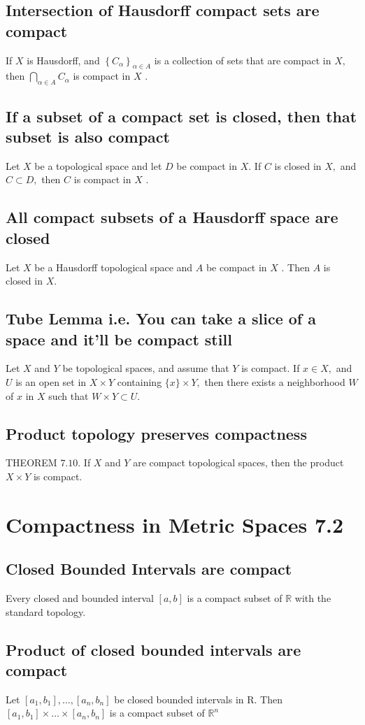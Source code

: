 \documentclass[12pt]{article}
\begin{document}
	\subsection{Intersection of Hausdorff compact sets are compact}
	If $X$ is Hausdorff, and $\left\{ C _ { \alpha } \right\} _ { \alpha \in A }$ is a collection of sets that are	compact in $X ,$ then $\bigcap _ { \alpha \in A } C _ { \alpha }$ is compact in $X$ .
	\subsection{If a subset of a compact set is closed, then that subset is also compact}
	Let $X$ be a topological space and let $D$ be compact in $X $. If $C$ is closed in $X ,$ and $C \subset D ,$ then $C$ is compact in $X$ .
	\subsection{All compact subsets of a Hausdorff space are closed}
	Let $X$ be a Hausdorff topological space and $A$ be compact in $X$ . Then $A$ is closed in $X .$
	\subsection{Tube Lemma i.e. You can take a slice of a space and it'll be compact still}
	Let $X$ and $Y$ be topological spaces, and assume that $Y$ is compact. If $x \in X ,$ and $U$ is an open set in $X \times Y$ containing $\{ x \} \times Y ,$ then there exists a neighborhood $W$ of $x$ in $X$ such that $W \times Y \subset U$.
	\subsection{Product topology preserves compactness}
	THEOREM $7.10 .$ If $X$ and $Y$ are compact topological spaces, then the product $X \times Y$ is compact.
	\setcounter{section}{6}
	\section{Compactness in Metric Spaces 7.2}
	\subsection{Closed Bounded Intervals are compact}
	Every closed and bounded interval $[ a , b ]$ is a compact subset of $\mathbb { R }$ with the standard topology.	
	\subsection{Product of closed bounded intervals are compact}
	Let $\left[ a _ { 1 } , b _ { 1 } \right] , \ldots , \left[ a _ { n } , b _ { n } \right]$ be closed bounded intervals in R. Then $\left[ a _ { 1 } , b _ { 1 } \right] \times \ldots \times \left[ a _ { n } , b _ { n } \right]$ is a compact subset of $\mathbb { R } ^ { n }$
	
\end{document}
